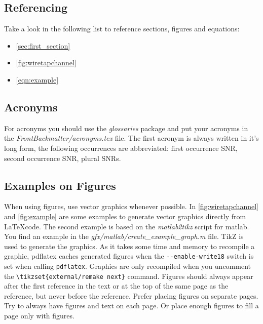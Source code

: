 \subsection{Referencing}

Take a look in the following list to reference sections, figures and equations:
\begin{itemize}
  \item \autoref{sec:first_section}
  \item \autoref{fig:wiretapchannel}
  \item \autoref{eqn:example}
\end{itemize}


\subsection{Acronyms}
For acronyms you should use the \emph{glossaries} package and put your acronyms
in the \emph{FrontBackmatter/acronyms.tex} file. The first acronym is always
written in it's long form, the following occurrences are abbreviated: first
occurrence \gls{SNR}, second occurrence \gls{SNR}, plural \glspl{SNR}.


\subsection{Examples on Figures}

\sloppy
When using figures, use vector graphics whenever possible. In
\autoref{fig:wiretapchannel} and \autoref{fig:example} are some examples to
generate vector graphics directly from \LaTeX code. The second example is based
on the \emph{matlab2tikz} script for matlab. You find an example in the
\mbox{\emph{gfx/matlab/create\_example\_graph.m}} file. TikZ is used to generate
the graphics. As it takes some time and memory to recompile a graphic, pdflatex
caches generated figures when the \lstinline|--enable-write18| switch is set
when calling \lstinline|pdflatex|. Graphics are only recompiled when you
uncomment the \lstinline|\tikzset{external/remake next}| command. Figures should
always appear after the first reference in the text or at the top of the same
page as the reference, but never before the reference. Prefer placing figures on
separate pages. Try to always have figures and text on each page. Or place
enough figures to fill a page only with figures.

